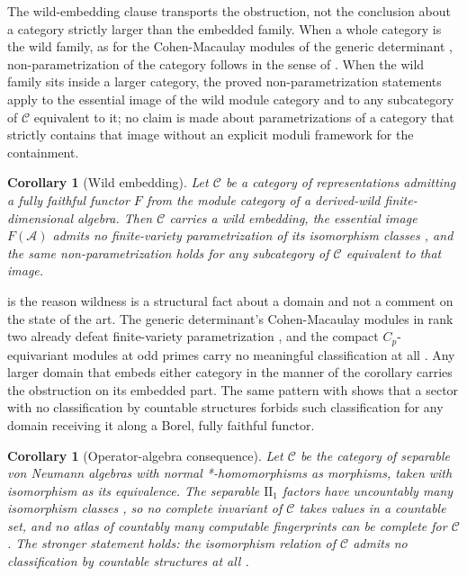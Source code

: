 \documentclass[11pt,letterpaper]{article}
\newtheorem{corollary}[theorem]{Corollary}
\theoremstyle{definition}
\theoremstyle{remark}
\begin{document}
The wild-embedding clause transports the obstruction, not the conclusion about a category strictly larger than the embedded family. When a whole category is the wild family, as for the Cohen-Macaulay modules of the generic determinant \cite{buchweitz2005}, non-parametrization of the category follows in the sense of . When the wild family sits inside a larger category, the proved non-parametrization statements apply to the essential image of the wild module category and to any subcategory of $\mathcal{C}$ equivalent to it; no claim is made about parametrizations of a category that strictly contains that image without an explicit moduli framework for the containment.

\begin{corollary}[Wild embedding]
\label{cor:wild}
Let $\mathcal{C}$ be a category of representations admitting a fully faithful functor $F$ from the module category of a derived-wild finite-dimensional algebra. Then $\mathcal{C}$ carries a wild embedding, the essential image $F(\mathcal{A})$ admits no finite-variety parametrization of its isomorphism classes \cite{bekkert2003,buchweitz2005,grevstad2025}, and the same non-parametrization holds for any subcategory of $\mathcal{C}$ equivalent to that image.
\end{corollary}

 is the reason wildness is a structural fact about a domain and not a comment on the state of the art. The generic determinant's Cohen-Macaulay modules in rank two already defeat finite-variety parametrization \cite{buchweitz2005}, and the compact $C_p$-equivariant modules at odd primes carry no meaningful classification at all \cite{grevstad2025}. Any larger domain that embeds either category in the manner of the corollary carries the obstruction on its embedded part. The same pattern with  shows that a sector with no classification by countable structures forbids such classification for any domain receiving it along a Borel, fully faithful functor.

\begin{corollary}[Operator-algebra consequence]
\label{cor:opalg}
Let $\mathcal{C}$ be the category of separable von Neumann algebras with normal *-homomorphisms as morphisms, taken with isomorphism as its equivalence. The separable $\mathrm{II}_1$ factors have uncountably many isomorphism classes \cite{mcduff1969}, so no complete invariant of $\mathcal{C}$ takes values in a countable set, and no atlas of countably many computable fingerprints can be complete for $\mathcal{C}$. The stronger statement holds: the isomorphism relation of $\mathcal{C}$ admits no classification by countable structures at all \cite{sasyk2009}.
\end{corollary}
\end{document}
